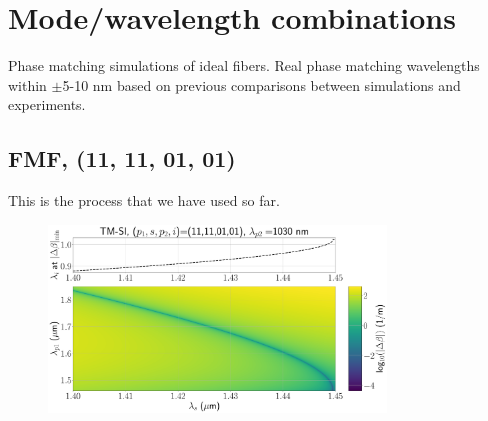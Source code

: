 \documentclass[11pt, headings=optiontoheadandtoc]{article}
\begin{document}
\section{Mode/wavelength combinations}
Phase matching simulations of ideal fibers. Real phase matching wavelengths within $\pm$5-10 nm based on previous comparisons between simulations and experiments.
\subsection{FMF, (11, 11, 01, 01)}
This is the process that we have used so far.
\begin{figure}[h]
    \centering
    \includegraphics[width=0.8\textwidth]{./figs/TMSI_(11,11,01,01)_1030_2d_dbeta.pdf}
    \caption{}
    \label{fig:hom_1030}
\end{figure}
\end{document}
